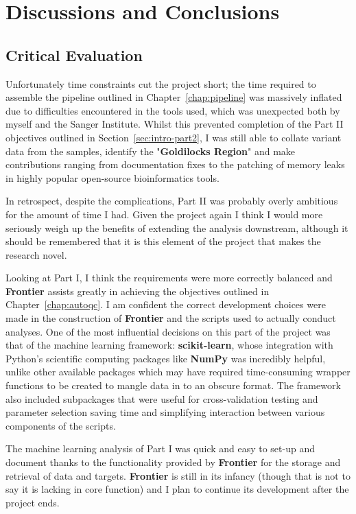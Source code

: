 \part{Discussions and Conclusions}

\chapter{Critical Evaluation}

Unfortunately time constraints cut the project short; the time required to
assemble the pipeline outlined in Chapter~\ref{chap:pipeline}
was massively inflated due to difficulties encountered in the tools used,
which was unexpected both by myself and the Sanger Institute.
Whilst this prevented completion of the Part II objectives outlined in
Section~\ref{sec:intro-part2}, I was still able to collate variant data from the
samples, identify the "\textbf{Goldilocks Region}" and make contributions
ranging from documentation fixes to the patching of memory leaks in
highly popular open-source bioinformatics tools.

In retrospect, despite the complications, Part II was probably overly
ambitious for the amount of time I had. Given the project again I think I would
more seriously weigh up the benefits of extending the analysis downstream,
although it should be remembered that it is this element of the project that
makes the research novel.

Looking at Part I, I think the requirements were more correctly balanced and
\textbf{Frontier} assists greatly in achieving the objectives outlined in
Chapter~\ref{chap:autoqc}. I am confident the correct development choices were
made in the construction of \textbf{Frontier} and the scripts used to actually
conduct analyses. One of the most influential decisions on this part of the
project was that of the machine learning framework: \textbf{scikit-learn}, whose
integration with Python's scientific computing packages like \textbf{NumPy} was
incredibly helpful, unlike other available packages which may have required
time-consuming wrapper functions to be created to mangle data in to an obscure
format. The framework also included subpackages that were useful for
cross-validation testing and parameter selection saving time and simplifying
interaction between various components of the scripts.

The machine learning analysis of Part I was quick and easy to set-up and
document thanks to the functionality provided by \textbf{Frontier} for the
storage and retrieval of data and targets. \textbf{Frontier} is still in its
infancy (though that is not to say it is lacking in core function) and I plan to
continue its development after the project ends.


